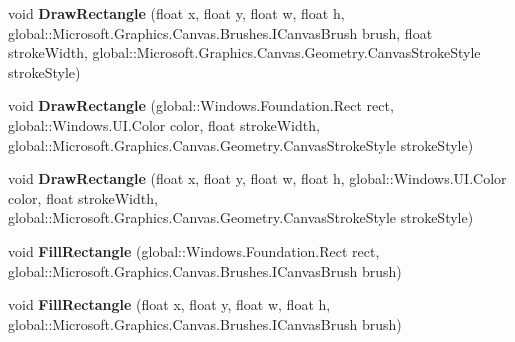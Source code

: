 \begin{DoxyCompactItemize}
\item 
\mbox{\label{interface_microsoft_1_1_graphics_1_1_canvas_1_1_i_canvas_drawing_session_ae3c965e98ad619649d1740114ea65691}} 
void {\bfseries Draw\+Rectangle} (float x, float y, float w, float h, global\+::\+Microsoft.\+Graphics.\+Canvas.\+Brushes.\+I\+Canvas\+Brush brush, float stroke\+Width, global\+::\+Microsoft.\+Graphics.\+Canvas.\+Geometry.\+Canvas\+Stroke\+Style stroke\+Style)
\item 
\mbox{\label{interface_microsoft_1_1_graphics_1_1_canvas_1_1_i_canvas_drawing_session_a44f123ddca8e9582ef8859358cb43c33}} 
void {\bfseries Draw\+Rectangle} (global\+::\+Windows.\+Foundation.\+Rect rect, global\+::\+Windows.\+U\+I.\+Color color, float stroke\+Width, global\+::\+Microsoft.\+Graphics.\+Canvas.\+Geometry.\+Canvas\+Stroke\+Style stroke\+Style)
\item 
\mbox{\label{interface_microsoft_1_1_graphics_1_1_canvas_1_1_i_canvas_drawing_session_a076b55543b9248eaf8df01b43faaae55}} 
void {\bfseries Draw\+Rectangle} (float x, float y, float w, float h, global\+::\+Windows.\+U\+I.\+Color color, float stroke\+Width, global\+::\+Microsoft.\+Graphics.\+Canvas.\+Geometry.\+Canvas\+Stroke\+Style stroke\+Style)
\item 
\mbox{\label{interface_microsoft_1_1_graphics_1_1_canvas_1_1_i_canvas_drawing_session_aad333fe9cc512391f9d24c3f715ed511}} 
void {\bfseries Fill\+Rectangle} (global\+::\+Windows.\+Foundation.\+Rect rect, global\+::\+Microsoft.\+Graphics.\+Canvas.\+Brushes.\+I\+Canvas\+Brush brush)
\item 
\mbox{\label{interface_microsoft_1_1_graphics_1_1_canvas_1_1_i_canvas_drawing_session_a2a2999da33b0d1f6811b4606a6eb61c3}} 
void {\bfseries Fill\+Rectangle} (float x, float y, float w, float h, global\+::\+Microsoft.\+Graphics.\+Canvas.\+Brushes.\+I\+Canvas\+Brush brush)
\item 
\mbox{\label{interface_microsoft_1_1_graphics_1_1_canvas_1_1_i_canvas_drawing_session_af900874c2935bdf5765d740b10e6db49}} 

\end{DoxyCompactItemize}
